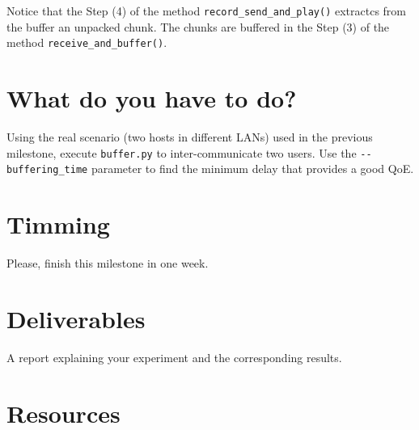 Notice that the Step (4) of the method \verb|record_send_and_play()|
extractcs from the buffer an unpacked chunk. The chunks are buffered
in the Step (3) of the method \verb|receive_and_buffer()|.


\section{What do you have to do?}

Using the real scenario (two hosts in different LANs) used in the
previous milestone, execute \verb|buffer.py| to inter-communicate two
users. Use the \verb|--buffering_time| parameter to find the minimum
delay that provides a good QoE.

\section{Timming}

Please, finish this milestone in one week.

\section{Deliverables}

A report explaining your experiment and the corresponding results.

\section{Resources}


